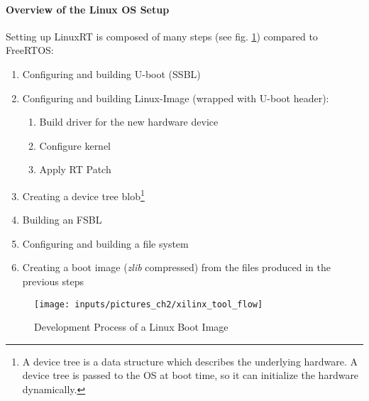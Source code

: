 \paragraph{Overview of the Linux \ac{OS} Setup}
Setting up LinuxRT is composed of many steps (see fig. \ref{fig_xilinx_tool_flow}) compared to FreeRTOS:
\begin{enumerate}
	\item Configuring and building U-boot (\ac{SSBL})
	\item Configuring and building Linux-Image (wrapped with U-boot header):
		\begin{enumerate}
			\item Build driver for the new hardware device
			\item Configure kernel
			\item Apply RT Patch
		\end{enumerate}
	\item Creating a device tree blob\footnote{A device tree is a data structure which describes the underlying hardware. A device tree is passed to the \ac{OS} at boot time, so it can initialize the hardware dynamically.\cite{device_tree}}
	\item Building an \ac{FSBL}
	\item Configuring and building a file system
	\item Creating a boot image (\textit{zlib} compressed) from the files produced in the previous steps 
\end{enumerate}

\begin{figure}[htb]
		\begin{center}
			\texttt{[image: inputs/pictures\_ch2/xilinx\_tool\_flow]}
			\caption[Development Process of a Linux Boot Image]{Development Process of a Linux Boot Image \cite{xilinx:gt}} \label{fig_xilinx_tool_flow}
		\end{center}
\end{figure} 

